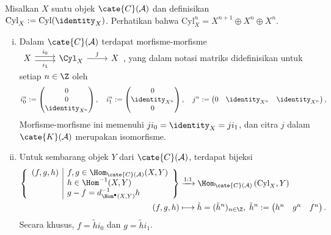 \begin{proposisi}\label{prop:cylinder-homotopy}
	Misalkan $X$ suatu objek $\cate{C}(\mathcal{A})$ dan definisikan
	$\mathrm{Cyl}_X:=\mathrm{Cyl}(\identity_X)$. Perhatikan bahwa
	$\mathrm{Cyl}_X^n=X^{n+1}\oplus X^n\oplus X^n$.
	\begin{enumerate}[(i)]
		\item Dalam $\cate{C}(\mathcal{A})$ terdapat morfisme-morfisme
		$\begin{tikzcd}
			X \arrow[shift left, r, "i_0"] \arrow[shift right, r, "i_1"'] & \Cyl_X \arrow[r, "j"] & X
		\end{tikzcd}$,
		yang dalam notasi matriks didefinisikan untuk setiap $n\in\Z$ oleh
		\begin{equation*}
			i_0^n := \begin{pmatrix} 0 \\ 0 \\ \identity_{X^n} \end{pmatrix} , \quad
			i_1^n := \begin{pmatrix} 0 \\ \identity_{X^n} \\ 0 \end{pmatrix} , \quad j^n := \begin{pmatrix} 0 & \identity_{X^n} & \identity_{X^n} \end{pmatrix},
		\end{equation*}
		Morfisme-morfisme ini memenuhi $ji_0=\identity_X=ji_1$, dan citra $j$
		dalam $\cate{K}(\mathcal{A})$ merupakan isomorfisme.
		\item Untuk sembarang objek $Y$ dari $\cate{C}(\mathcal{A})$, terdapat
		bijeksi
		\begin{align*}
			\left\{\begin{array}{r|l}
				(f, g, h) & f, g \in \Hom_{\cate{C}(\mathcal{A})}(X, Y) \\
				& h \in \Hom^{-1}(X, Y) \\
				& g - f = d^{-1}_{\Hom^\bullet(X, Y)} h
			\end{array}\right\} & \xrightarrow{1:1} \Hom_{\cate{C}(\mathcal{A})}\left( \mathrm{Cyl}_X, Y \right) \\
			(f, g, h) & \longmapsto \tilde{h} = (\tilde{h}^n)_{n \in \Z}, \; \tilde{h}^n := \begin{pmatrix} h^n & g^n & f^n \end{pmatrix}.
		\end{align*}
		Secara khusus, $f=\tilde{h}i_0$ dan $g=\tilde{h}i_1$.
	\end{enumerate}
\end{proposisi}
